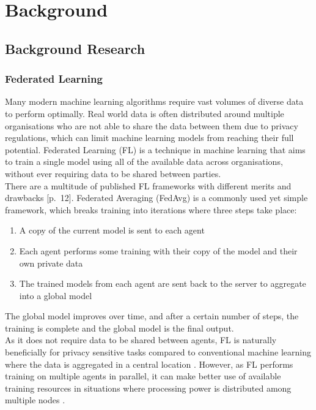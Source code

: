 \chapter{Background}
\section{Background Research}
\subsection{Federated Learning}
Many modern machine learning algorithms require vast volumes of diverse data to perform optimally. Real world data is often distributed around multiple organisations who are not able to share the data between them due to privacy regulations, which can limit machine learning models from reaching their full potential. Federated Learning (FL) \cite{survey_on_fed_learning} is a technique in machine learning that aims to train a single model using all of the available data across organisations, without ever requiring data to be shared between parties. \\

There are a multitude of published FL frameworks with different merits and drawbacks \cite{survey_on_fed_learning}[p.~12]. Federated Averaging (FedAvg) \cite{fed_learning} is a commonly used yet simple framework, which breaks training into iterations where three steps take place:
\begin{enumerate}
	\item A copy of the current model is sent to each agent
	\item Each agent performs some training with their copy of the model and their own private data
	\item The trained models from each agent are sent back to the server to aggregate into a global model
\end{enumerate}
The global model improves over time, and after a certain number of steps, the training is complete and the global model is the final output. \\

As it does not require data to be shared between agents, FL is naturally beneficially for privacy sensitive tasks compared to conventional machine learning where the data is aggregated in a central location \citeme. However, as FL performs training on multiple agents in parallel, it can make better use of available training resources in situations where processing power is distributed among multiple nodes \citeme. 

